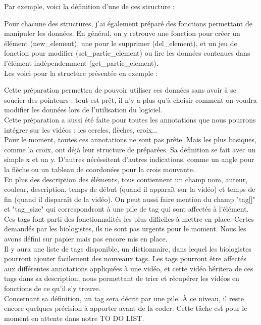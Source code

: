 \documentclass[11pt,french,a4paper]{report}
\begin{document}
Par exemple, voici la définition d'une de ces structure : 

Pour chacune des structures, j'ai également préparé des fonctions permettant de manipuler les données.
En général, on y retrouve une fonction pour créer un élément (new\_element), une pour le supprimer (del\_element),
et un jeu de fonction pour modifier (set\_partie\_element) ou lire les données contenues dans l'élément indépendemment 
(get\_partie\_element). \\
Les voici pour la structure présentée en exemple : 


Cette préparation permettra de pouvoir utiliser ces données sans avoir à se soucier des pointeurs : tout est prêt, il n'y
a plus qu'à choisir comment on voudra modifier les données lors de l'utilisation du logiciel. \\

Cette préparation a aussi été faite pour toutes les annotations que nous pourrons intégrer sur les vidéos : 
les cercles, flèches, croix... \\

Pour le moment, toutes ces annotations ne sont pas prête. Mais les plus basiques, comme la croix, ont déjà leur structure de préparées.
Sa définition se fait avec un simple x et un y. D'autres nécéssitent d'autres indications, comme un angle pour la flèche
ou un tableau de coordonées pour la crois mouvante. \\

En plus des description des éléments, tous contiennent un champ nom, auteur, couleur, description, temps de début 
(quand il apparaît sur la vidéo) et temps de fin (quand il disparaît de la vidéo). 
On peut aussi faire mention du champ "tag[]" et "tag\_size" qui correspondront à une pile de tag qui sont affectés à l'élément. \\

Ces tags font parti des fonctionnalités les plus difficiles à mettre en place. Certes demandés par les biologistes, ils ne sont 
pas urgents pour le moment. Nous les avons défini sur papier mais pas encore mis en place. \\

Il y aura une liste de tags disponible, un dictionnaire, dans lequel les biologistes pourront 
ajouter facilement des nouveaux tags. Les tags pourront être affectés aux différentes annotations appliquées
à une vidéo, et cette vidéo héritera de ces tags dans sa description, nous permettant de trier et récupérer les vidéos 
en fonctions de ce qu'il s'y trouve. \\
Concernant sa définition, un tag sera décrit par une pile. À ce niveau, il reste encore quelques précision à apporter
avant de la coder. Cette tâche est pour le moment en attente dans notre TO DO LIST. 
\end{document}
